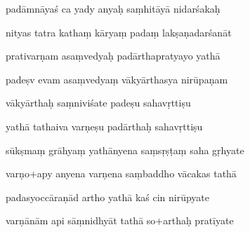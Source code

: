 \documentclass[article,12pt,a4paper]{memoir}%
\newcounter{parCount}
\begin{document}
	  
	  \pstart {} padāmnāyaś ca yady anyaḥ saṃhitāyā nidarśakaḥ 
	{}
	\pend%
      

	  
	  \pstart \leavevmode%
	nityas tatra kathaṃ kāryaṃ padaṃ lakṣaṇadarśanāt 
	{}
	\pend%
      

	  
	  \pstart {} prativarṇam asaṃvedyaḥ padārthapratyayo yathā 
	{}
	\pend%
      

	  
	  \pstart \leavevmode%
	padeṣv evam asaṃvedyaṃ vākyārthasya nirūpaṇam 
	{}
	\pend%
      

	  
	  \pstart {} vākyārthaḥ saṃniviśate padeṣu sahavṛttiṣu 
	{}
	\pend%
      

	  
	  \pstart \leavevmode%
	yathā tathaiva varṇeṣu padārthaḥ sahavṛttiṣu 
	{}
	\pend%
      

	  
	  \pstart {} sūkṣmaṃ grāhyaṃ yathānyena saṃsṛṣṭaṃ saha gṛhyate 
	{}
	\pend%
      

	  
	  \pstart \leavevmode%
	varṇo+apy anyena varṇena saṃbaddho vācakas tathā 
	{}
	\pend%
      

	  
	  \pstart {} padasyoccāraṇād artho yathā kaś cin nirūpyate 
	{}
	\pend%
      

	  
	  \pstart \leavevmode%
	varṇānām api sāṃnidhyāt tathā so+arthaḥ pratīyate 
	{}
	\pend%
      
\end{document}
